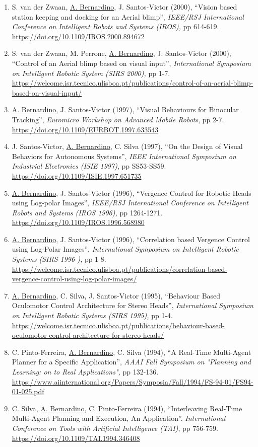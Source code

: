 \documentclass[
]{article}
\begin{document}
\begin{enumerate}
\item
  S. van der Zwaan, \ul{A. Bernardino}, J. Santos-Victor (2000),
  ``Vision based station keeping and docking for an Aerial blimp'',
  \emph{IEEE/RSJ International Conference on Intelligent Robots and
  Systems (IROS),} pp 614-619.
  \url{https://doi.org/10.1109/IROS.2000.894672}~
\item
  S. van der Zwaan, M. Perrone, \ul{A. Bernardino}, J. Santos-Victor
  (2000), ``Control of an Aerial blimp based on visual input'',
  \emph{International Symposium on Intelligent Robotic System (SIRS
  2000),} pp 1-7.
  \url{https://welcome.isr.tecnico.ulisboa.pt/publications/control-of-an-aerial-blimp-based-on-visual-input/}~
\item
  \ul{A. Bernardino}, J. Santos-Victor (1997), ``Visual Behaviours for
  Binocular Tracking'', \emph{Euromicro Workshop on Advanced Mobile
  Robots}, pp 2-7. \url{https://doi.org/10.1109/EURBOT.1997.633543}
\item
  J. Santos-Victor, \ul{A. Bernardino}, C. Silva (1997), ``On the Design
  of Visual Behaviors for Autonomous Systems'', \emph{IEEE International
  Symposium on Industrial Electronics (ISIE 1997)}, pp SS53-SS59.
  \url{https://doi.org/10.1109/ISIE.1997.651735} ~
\item
  \ul{A. Bernardino}, J. Santos-Victor (1996), ``Vergence Control for
  Robotic Heads using Log-polar Images'', \emph{IEEE/RSJ International
  Conference on Intelligent Robots and Systems (IROS 1996),} pp
  1264-1271. \url{https://doi.org/10.1109/IROS.1996.568980}~
\item
  \ul{A. Bernardino}, J. Santos-Victor (1996), ``Correlation based
  Vergence Control using Log-Polar Images'', \emph{International
  Symposium on Intelligent Robotic Systems (SIRS 1996 ),} pp 1-8.
  \url{https://welcome.isr.tecnico.ulisboa.pt/publications/correlation-based-vergence-control-using-log-polar-images/}~
\item
  \ul{A. Bernardino}, C. Silva, J. Santos-Victor (1995), ``Behaviour
  Based Oculomotor Control Architecture for Stereo Heads'',
  \emph{International Symposium on Intelligent Robotic Systems (SIRS
  1995),} pp 1-4.
  \url{https://welcome.isr.tecnico.ulisboa.pt/publications/behaviour-based-oculomotor-control-architecture-for-stereo-heads/}~
\item
  C. Pinto-Ferreira, \ul{A. Bernardino}, C. Silva (1994), ``A Real-Time
  Multi-Agent Planner for a Specific Application'', \emph{AAAI Fall
  Symposium on "Planning and Learning: on to Real Applications",} pp
  132-136.
  \url{https://www.aiinternational.org/Papers/Symposia/Fall/1994/FS-94-01/FS94-01-025.pdf}
\item
  C. Silva, \ul{A. Bernardino}, C. Pinto-Ferreira (1994), ``Interleaving
  Real-Time Multi-Agent Planning and Execution, An Application''.
  \emph{International Conference on Tools with Artificial Intelligence
  (TAI)}, pp 756-759. \url{https://doi.org/10.1109/TAI.1994.346408}
\end{enumerate}
\end{document}
